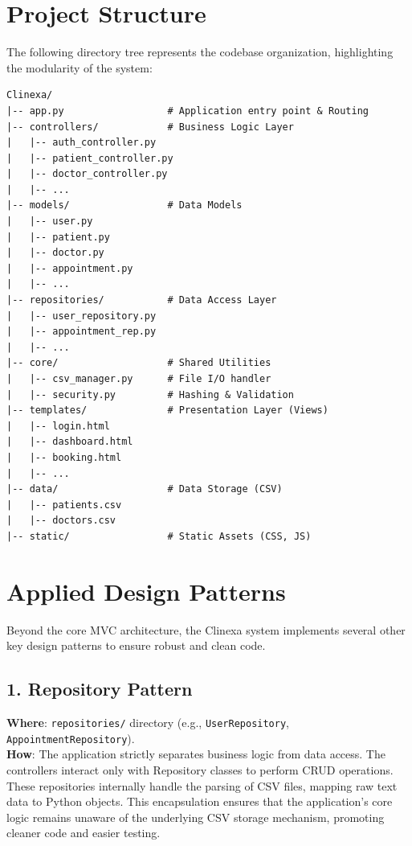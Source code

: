 \documentclass[12pt,a4paper]{article}
\begin{document}

\section{Project Structure}

The following directory tree represents the codebase organization, highlighting the modularity of the system:

\begin{verbatim}
Clinexa/
|-- app.py                  # Application entry point & Routing
|-- controllers/            # Business Logic Layer
|   |-- auth_controller.py
|   |-- patient_controller.py
|   |-- doctor_controller.py
|   |-- ...
|-- models/                 # Data Models
|   |-- user.py
|   |-- patient.py
|   |-- doctor.py
|   |-- appointment.py
|   |-- ...
|-- repositories/           # Data Access Layer
|   |-- user_repository.py
|   |-- appointment_rep.py
|   |-- ...
|-- core/                   # Shared Utilities
|   |-- csv_manager.py      # File I/O handler
|   |-- security.py         # Hashing & Validation
|-- templates/              # Presentation Layer (Views)
|   |-- login.html
|   |-- dashboard.html
|   |-- booking.html
|   |-- ...
|-- data/                   # Data Storage (CSV)
|   |-- patients.csv
|   |-- doctors.csv
|-- static/                 # Static Assets (CSS, JS)
\end{verbatim}

\section{Applied Design Patterns}

Beyond the core MVC architecture, the Clinexa system implements several other key design patterns to ensure robust and clean code.

\subsection{1. Repository Pattern}
\textbf{Where}: \texttt{repositories/} directory (e.g., \texttt{UserRepository}, \texttt{AppointmentRepository}). \\
\textbf{How}: The application strictly separates business logic from data access. The controllers interact only with Repository classes to perform CRUD operations. These repositories internally handle the parsing of CSV files, mapping raw text data to Python objects. This encapsulation ensures that the application's core logic remains unaware of the underlying CSV storage mechanism, promoting cleaner code and easier testing.
\end{document}
